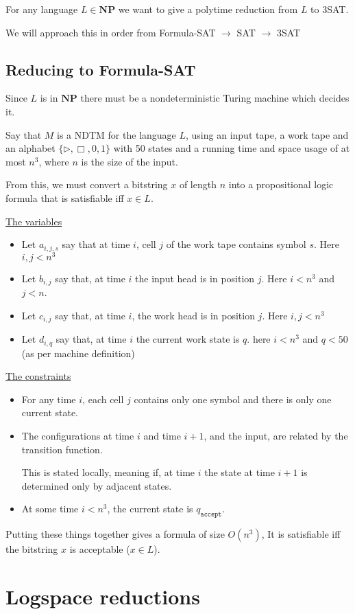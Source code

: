\documentclass{article}
\newcommand{\NP}{\mathbf{NP}}
\begin{document}
For any language $L \in \NP$ we want to give a polytime reduction from $L$ to 3SAT.

We will approach this in order from Formula-SAT $\rightarrow$ SAT $\rightarrow $ 3SAT

\subsection{Reducing to Formula-SAT}
\label{subsec:r-fsat}

Since $L$ is in $\NP$ there must be a nondeterministic Turing machine which decides it.

Say that $M$ is a NDTM for the language $L$, using an input tape, a work tape and an alphabet $\{ \rhd, \Box, 0,1 \} $ with 50 states and a running time and space usage of at most $n^{3}$, where $n$ is the size of the input.

From this, we must convert a bitstring $x$ of length $n$ into a propositional logic formula that is satisfiable iff $x\in L$.

\underline{The variables}
\begin{itemize}
  \item Let $a_{i,j,s}$ say that at time $i$, cell $j$ of the work tape contains symbol $s$. Here $i,j < n^{3}$
  \item Let $b_{i,j}$ say that, at time $i$ the input head is in position $j$. Here $i < n^{3}$ and $j < n$.
  \item Let $c_{i,j}$ say that, at time $i$, the work head is in position $j$. Here $i,j < n^{3}$
  \item Let $d_{i,q}$ say that, at time $i$ the current work state is $q$. here $i < n^{3}$ and $q < 50$ (as per machine definition)
\end{itemize}

\underline{The constraints}

\begin{itemize}
  \item For any time $i$, each cell $j$ contains only one symbol and there is only one current state.
  \item The configurations at time $i$ and time $i+1$, and the input, are related by the transition function.

        This is stated locally, meaning if, at time $i$ the state at time $i+1$ is determined only by adjacent states.
  \item At some time $i < n^{3}$, the current state is $q_{\texttt{accept} }$.
\end{itemize}

Putting these things together gives a formula of size $O(n^{3})$, It is satisfiable iff the bitstring $x$ is acceptable ($x \in L$).


\section{Logspace reductions}
\label{sec:logspace}
\end{document}
